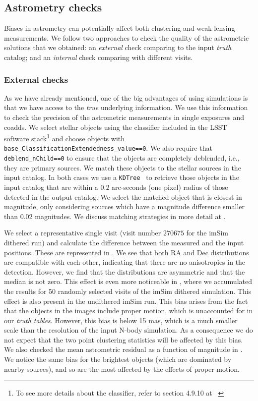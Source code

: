 \documentclass[twocolumn]{aastex62}
\begin{document}
\subsection{Astrometry checks}
\label{sec:astrometry_checks}

Biases in astrometry can potentially affect both clustering and weak lensing measurements. We follow two approaches to check the quality of the astrometric solutions that we obtained: an \textit{external} check comparing to the input \textit{truth} catalog; and an \textit{internal} check comparing with different visits.

\subsubsection{External checks}
\label{sec:external_astrometry}

As we have already mentioned, one of the big advantages of using simulations is that we have access to the \textit{true} underlying information. We use this information to check the precision of the astrometric measurements in single exposures and coadds. We select stellar objects using the classifier included in the LSST software stack\footnote{To see more details about the classifier, refer to section 4.9.10 at ~\citet{2017arXiv170506766B}} and choose objects with \texttt{base\_ClassificationExtendedness\_value==0}.
We also require that \texttt{deblend\_nChild==0} to ensure that the objects are completely deblended, i.e., they are primary sources. We match these objects to the stellar sources in the input catalog. In both cases we use a \texttt{KDTree}~\citep{scikit-learn} to retrieve those objects in the input catalog that are within a 0.2 arc-seconds (one pixel) radius of those detected in the output catalog. We select the matched object that is closest in magnitude, only considering sources which have a magnitude difference smaller than 0.02 magnitudes. We discuss matching strategies in more detail at .

We select a representative single visit (visit number $270675$ for the imSim dithered run) and calculate the difference between the measured and the input positions. These are represented in . We see that both RA and Dec distributions are compatible with each other, indicating that there are no anisotropies in the detection.
However, we find that the distributions are asymmetric and that the median is not zero. This effect is even more noticeable in , where we accumulated the results for 50 randomly selected visits of the imSim dithered simulation. This effect is also present in the undithered imSim run. This bias arises from the fact that the objects in the images include proper motion, which is unaccounted for in our \textit{truth tables}. However, this bias is below 15 mas, which is a much smaller scale than the resolution of the input N-body simulation. As a consequence we do not expect that the two point clustering statistics will be affected by this bias. We also checked the mean astrometric residual as a function of magnitude in . We notice the same bias for the brightest objects (which are dominated by nearby sources), and so are the most affected by the effects of proper motion.
\end{document}
